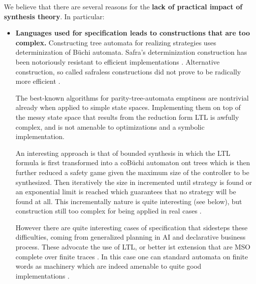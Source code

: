 We believe that there are several reasons for the \textbf{lack of practical impact
of synthesis theory}.  In particular:
\begin{itemize}
\item \textbf{Languages used for specification leads to constructions that are too complex.}
%
Constructing tree automata for realizing strategies uses
determinization of B\"uchi automata. Safra's determinization
construction has been notoriously resistant to efficient
implementations \cite{TsaiFVT14}. Alternative construction, so called
safraless constructions \cite{KupfermanV05,KupfermanPV06} did not
prove to be radically more efficient \cite{FiliotJR11}.

The best-known algorithms for parity-tree-automata emptiness
\cite{JurdzinskiPZ08} are nontrivial already when applied to simple
state spaces. Implementing them on top of the messy state space that
results from the reduction form LTL is awfully complex, and is not
amenable to optimizations and a symbolic implementation.

An interesting approach is that of bounded synthesis
\cite{FinkbeinerS13,FiliotJR11,FaymonvilleFRT17} in which the LTL
formula is first transformed into a coB\"uchi automaton ont trees
which is then further reduced a safety game given the maximum size of
the controller to be synthesized. Then iteratively the size in
incremented until strategy is found or an exponential limit is reached
which guarantees that no strategy will be found at all. This
incrementally nature is quite interesting (see below), but
construction still too complex for being applied in real cases
\cite{JacobsBBK0KKLNP16}.

However there are quite interesting cases of specification that sidesteps these difficulties, coming from
generalized planning in AI and declarative business process. These
advocate the use of LTL, or better ist extension that are MSO complete
over finite traces . In this case one can standard automata on finite
words as machinery which are indeed amenable to quite good
implementations \cite{AalstPS09,DeVa13,DeVa15,DeVa16,TorresB15,CamachoTMBM17}.



\end{itemize}
